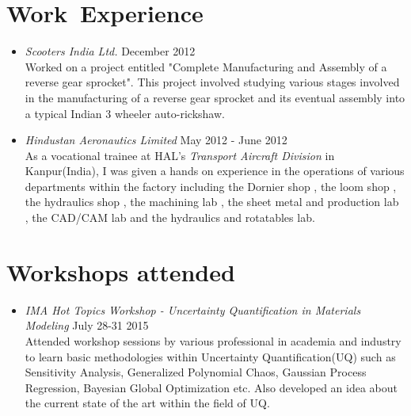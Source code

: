 \documentclass[11pt, line, margin]{res}
\begin{document}
\begin{resume}
\section{\Large Work\ Experience}
\begin{itemize}
\item \textit{Scooters India Ltd.} \hfill December 2012 \\ Worked on a project entitled "Complete Manufacturing and Assembly of a reverse gear sprocket". This project involved studying various stages involved in the manufacturing of a reverse gear sprocket and its eventual assembly into a typical Indian 3 wheeler auto-rickshaw.
\item \textit{Hindustan Aeronautics Limited} \hfill May 2012 - June 2012 \\ As a vocational trainee at HAL's \textit{Transport Aircraft Division} in Kanpur(India), I was given a hands on experience in the operations of various departments within the factory including the Dornier shop , the loom shop , the hydraulics shop , the machining lab , the sheet metal and production lab , the CAD/CAM lab and the hydraulics and rotatables lab.
\end{itemize}

\section{Workshops attended}
\begin{itemize}
\item \textit{IMA Hot Topics Workshop - Uncertainty Quantification in Materials Modeling} \hfill July 28-31 2015 \\ Attended workshop sessions by various professional in academia and industry to learn basic methodologies within Uncertainty Quantification(UQ) such as Sensitivity Analysis, Generalized Polynomial Chaos, Gaussian Process Regression, Bayesian Global Optimization etc. Also developed an idea about the current state of the art within the field of UQ.  
\end{itemize}

\end{resume}
\end{document}
